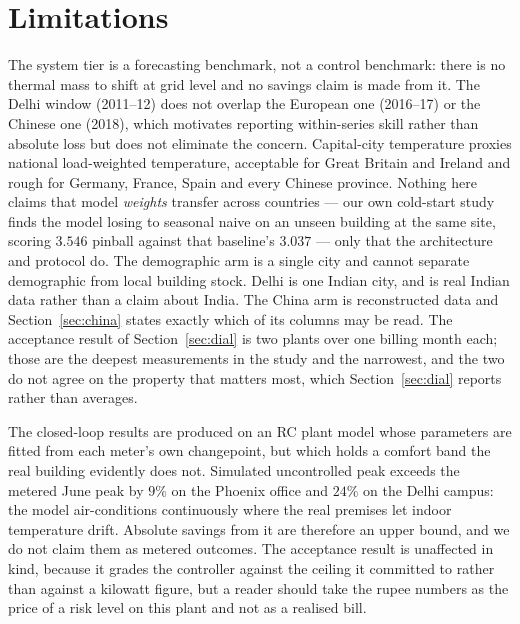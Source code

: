 \section{Limitations}

The system tier is a forecasting benchmark, not a control benchmark: there is no
thermal mass to shift at grid level and no savings claim is made from it. The
Delhi window (2011--12) does not overlap the European one (2016--17) or the
Chinese one (2018), which motivates reporting within-series skill rather than
absolute loss but does not eliminate the concern. Capital-city temperature
proxies national load-weighted temperature, acceptable for Great Britain and
Ireland and rough for Germany, France, Spain and every Chinese province.
Nothing here claims that model \emph{weights} transfer across countries --- our
own cold-start study finds the model losing to seasonal naive on an unseen
building at the same site, scoring $3.546$ pinball against that baseline's
$3.037$ --- only that the architecture and protocol do. The demographic arm is a
single city and cannot separate demographic from local building stock. Delhi is
one Indian city, and is real Indian data rather than a claim about India. The
China arm is reconstructed data and Section~\ref{sec:china} states exactly which
of its columns may be read. The acceptance result of Section~\ref{sec:dial} is
two plants over one billing month each; those are the deepest measurements in
the study and the narrowest, and the two do not agree on the property that
matters most, which Section~\ref{sec:dial} reports rather than averages.

The closed-loop results are produced on an RC plant model whose parameters are
fitted from each meter's own changepoint, but which holds a comfort band the
real building evidently does not. Simulated uncontrolled peak exceeds the
metered June peak by $9\%$ on the Phoenix office and $24\%$ on the Delhi
campus: the model air-conditions continuously where the real premises let
indoor temperature drift. Absolute savings from it are therefore an upper
bound, and we do not claim them as metered outcomes. The acceptance result is
unaffected in kind, because it grades the controller against the ceiling it
committed to rather than against a kilowatt figure, but a reader should take
the rupee numbers as the price of a risk level on this plant and not as a
realised bill.

